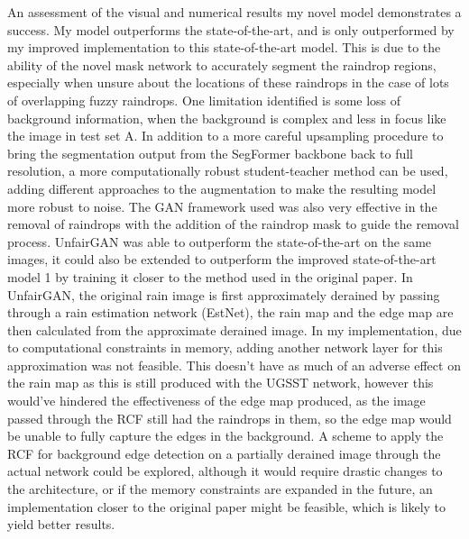 \documentclass[11pt]{ociamthesis}  %
\begin{document}
An assessment of the visual and numerical results my novel model demonstrates a success. My model outperforms the state-of-the-art, and is only outperformed by my improved implementation to this state-of-the-art model. This is due to the ability of the novel mask network to accurately segment the raindrop regions, especially when unsure about the locations of these raindrops in the case of lots of overlapping fuzzy raindrops. One limitation identified is some loss of background information, when the background is complex and less in focus like the image in test set A. In addition to a more careful upsampling procedure to bring the segmentation output from the SegFormer backbone back to full resolution, a more computationally robust student-teacher method can be used, adding different approaches to the augmentation to make the resulting model more robust to noise. The GAN framework used was also very effective in the removal of raindrops with the addition of the raindrop mask to guide the removal process. UnfairGAN was able to outperform the state-of-the-art on the same images, it could also be extended to outperform the improved state-of-the-art model 1 by training it closer to the method used in the original paper. In UnfairGAN\cite{NGUYEN2022118232}, the original rain image is first approximately derained by passing through a rain estimation network (EstNet), the rain map and the edge map are then calculated from the approximate derained image. In my implementation, due to computational constraints in memory, adding another network layer for this approximation was not feasible. This doesn't have as much of an adverse effect on the rain map as this is still produced with the UGSST network, however this would've hindered the effectiveness of the edge map produced, as the image passed through the RCF still had the raindrops in them, so the edge map would be unable to fully capture the edges in the background. A scheme to apply the RCF for background edge detection on a partially derained image through the actual network could be explored, although it would require drastic changes to the architecture, or if the memory constraints are expanded in the future, an implementation closer to the original paper might be feasible, which is likely to yield better results. 
\end{document}

